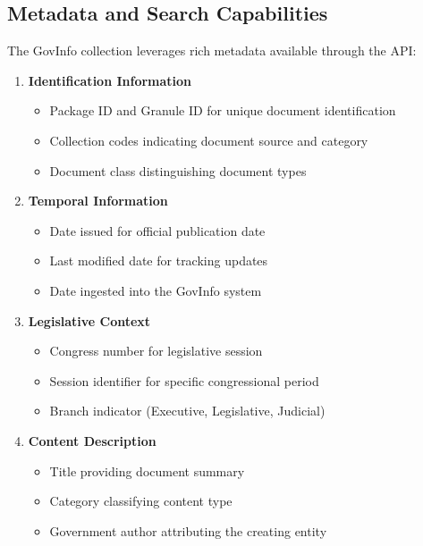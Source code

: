 \subsection{Metadata and Search Capabilities}

The GovInfo collection leverages rich metadata available through the API:

\begin{enumerate}
    \item \textbf{Identification Information}
    \begin{itemize}
        \item Package ID and Granule ID for unique document identification
        \item Collection codes indicating document source and category
        \item Document class distinguishing document types
    \end{itemize}
    
    \item \textbf{Temporal Information}
    \begin{itemize}
        \item Date issued for official publication date
        \item Last modified date for tracking updates
        \item Date ingested into the GovInfo system
    \end{itemize}
    
    \item \textbf{Legislative Context}
    \begin{itemize}
        \item Congress number for legislative session
        \item Session identifier for specific congressional period
        \item Branch indicator (Executive, Legislative, Judicial)
    \end{itemize}
    
    \item \textbf{Content Description}
    \begin{itemize}
        \item Title providing document summary
        \item Category classifying content type
        \item Government author attributing the creating entity
    \end{itemize}
\end{enumerate}

